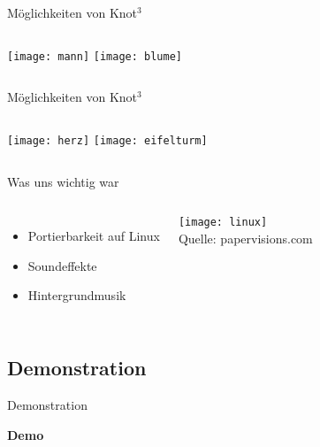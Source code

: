 \documentclass[18pt]{beamer}
\begin{document}
\begin{frame}{Möglichkeiten von Knot$^3$}

\begin{columns}[c]
 \texttt{[image: mann]}
 \texttt{[image: blume]}
\end{columns}
\end{frame}

\begin{frame}{Möglichkeiten von Knot$^3$}

\begin{columns}[c]
 \texttt{[image: herz]}
 \texttt{[image: eifelturm]}
\end{columns}
\end{frame}
\begin{frame}{Was uns wichtig war}

\begin{columns}[c] 
    \begin{itemize}
	\item Portierbarkeit auf Linux
	\item Soundeffekte
	\item Hintergrundmusik
	\end{itemize}
    \texttt{[image: linux]} \\
    Quelle: papervisions.com
    \end{columns}
\end{frame}



\subsection{Demonstration}
\begin{frame}{Demonstration}
\begin{center}
\Huge \textbf{Demo}
\end{center}

\end{frame}


\end{document}
